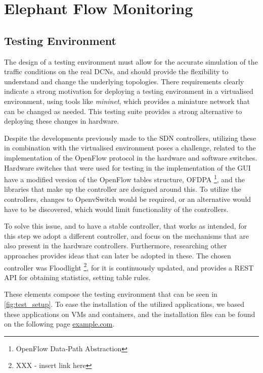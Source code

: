\chapter{Elephant Flow Monitoring} \label{chap:me} 

\section {Testing Environment}

The design of a testing environment must allow for the accurate simulation of the traffic conditions on the real DCNs, and should provide the flexibility to 
understand and change the underlying topologies. There requirements clearly indicate a strong motivation for deploying a testing environment in a virtualised
environment, using tools like \textit{mininet}, which provides a miniature network that can be changed as needed. This testing suite provides a strong 
alternative to deploying these changes in hardware.

\par Despite the developments previously made to the SDN controllers, utilizing these in combination with the virtualised environment poses a challenge, related 
to the implementation of the OpenFlow protocol in the hardware and software switches. Hardware switches that were used for testing in the implementation of
the GUI have a modified version of the OpenFlow tables structure, OFDPA \footnote{OpenFlow Data-Path Abstraction}, and the libraries that make up the 
controller are designed around this. To utilize the controllers, changes to OpenvSwitch would be required, or an alternative would have to be 
discovered, which would limit functionality of the controllers.

\par To solve this issue, and to have a stable controller, that works as intended, for this step we adopt a different controller, and focus on the mechanisms that 
are also present in the hardware controllers. Furthermore, researching other approaches provides ideas that can later be adopted in these. The chosen controller
was Floodlight \footnote { XXX - insert link here}, for it is continuously updated, and provides a REST API for obtaining statistics, setting table rules.

\par These elements compose the testing environment that can be seen in \ref{fig:test_setup}. To ease the installation of the utilized applications, 
we based these applications on VMs and containers, and the installation files can be found on the following page \url {example.com}.


